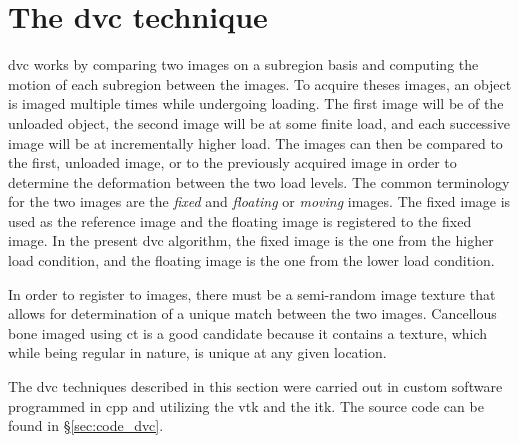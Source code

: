 \section{The \acs*{dvc} technique}
\label{sec:dvc_technique}
\acs{dvc} works by comparing two images on a subregion basis and computing the motion of each subregion between the images.
To acquire theses images, an object is imaged multiple times while undergoing loading.
The first image will be of the unloaded object, the second image will be at some finite load, and each successive image will be at incrementally higher load.
The images can then be compared to the first, unloaded image, or to the previously acquired image in order to determine the deformation between the two load levels.
The common terminology for the two images are the \textit{fixed} and \textit{floating} or \textit{moving} images.
The fixed image is used as the reference image and the floating image is registered to the fixed image.
In the present \ac{dvc} algorithm, the fixed image is the one from the higher load condition, and the floating image is the one from the lower load condition.

In order to register to images, there must be a semi-random image texture that allows for determination of a unique match between the two images.
Cancellous bone imaged using \ac{ct} is a good candidate because it contains a texture, which while being regular in nature, is unique at any given location.

The \ac{dvc} techniques described in this section were carried out in custom software programmed in \ac{cpp} and utilizing the \acf{vtk} and the \acf{itk}.
The source code can be found in \S\ref{sec:code_dvc}.

